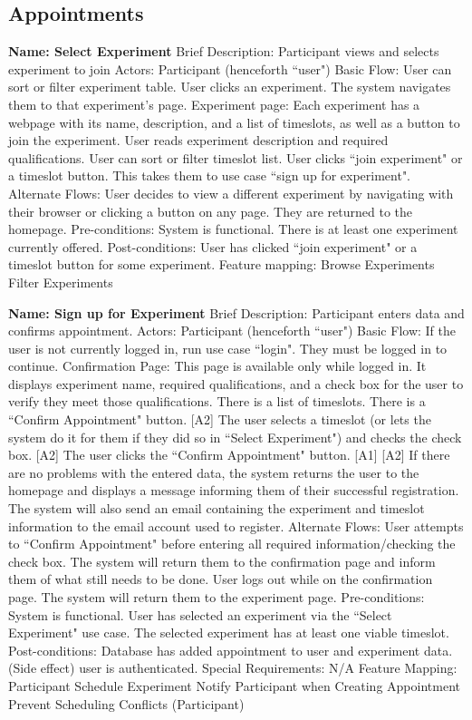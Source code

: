 \subsection{Appointments}
\begin{outline}[enumerate]


\1 {\bf Name: Select Experiment}
\2 Brief Description: Participant views and selects experiment to join
\2 Actors: Participant (henceforth ``user")
\2 Basic Flow:
\3 User can sort or filter experiment table.
\3 User clicks an experiment.  The system navigates them to that experiment's page.
\3 Experiment page: Each experiment has a webpage with its name, description, and a list of timeslots, as well as a button to join the experiment.
\3 User reads experiment description and required qualifications.
\3 User can sort or filter timeslot list.
\3 User clicks ``join experiment" or a timeslot button.  This takes them to use case ``sign up for experiment".
\2 Alternate Flows:
\3 [A1] User decides to view a different experiment by navigating with their browser or clicking a button on any page.  They are returned to the homepage.
\2 Pre-conditions:
\3 System is functional.
\3 There is at least one experiment currently offered.
\2 Post-conditions:
\3 User has clicked ``join experiment" or a timeslot button for some experiment.
\2 Feature mapping:
\3 Browse Experiments
\3 Filter Experiments

\1 {\bf Name: Sign up for Experiment}
\2 Brief Description: Participant enters data and confirms appointment.
\2 Actors: Participant (henceforth ``user")
\2 Basic Flow:
\3 If the user is not currently logged in, run use case ``login".  They must be logged in to continue.
\3 Confirmation Page: This page is available only while logged in.  It displays experiment name, required qualifications, and a check box for the user to verify they meet those qualifications. There is a list of timeslots. There is a ``Confirm Appointment" button. [A2]
\3 The user selects a timeslot (or lets the system do it for them if they did so in ``Select Experiment") and checks the check box. [A2]
\3 The user clicks the ``Confirm Appointment" button. [A1] [A2]
\3 If there are no problems with the entered data, the system returns the user to the homepage and displays a message informing them of their successful registration.  The system will also send an email containing the experiment and timeslot information to the email account used to register.
\2 Alternate Flows:
\3 [A1] User attempts to ``Confirm Appointment" before entering all required information/checking the check box.
\4 The system will return them to the confirmation page and inform them of what still needs to be done.
\3 [A2] User logs out while on the confirmation page.  The system will return them to the experiment page.
\2 Pre-conditions:
\3 System is functional.
\3 User has selected an experiment via the ``Select Experiment" use case.
\3 The selected experiment has at least one viable timeslot.
\2 Post-conditions:
\3 Database has added appointment to user and experiment data.
\3 (Side effect) user is authenticated.
\2 Special Requirements:
\3 N/A
\2 Feature Mapping:
\3 Participant Schedule Experiment
\3 Notify Participant when Creating Appointment
\3 Prevent Scheduling Conflicts (Participant)

\end{outline}
